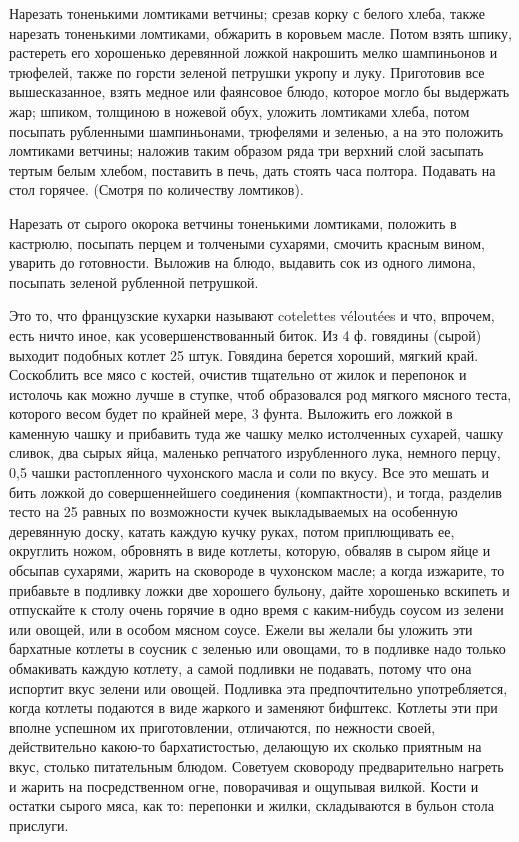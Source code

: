
Нарезать тоненькими ломтиками ветчины; срезав корку с белого хлеба, также нарезать тоненькими ломтиками, обжарить в коровьем масле. Потом взять шпику, растереть его хорошенько деревянной ложкой накрошить мелко шампиньонов и трюфелей, также по горсти зеленой петрушки укропу и луку. Приготовив все вышесказанное, взять медное или фаянсовое блюдо, которое могло бы выдержать жар; шпиком, толщиною в ножевой обух, уложить ломтиками хлеба, потом посыпать рубленными шампиньонами, трюфелями и зеленью, а на это положить ломтиками ветчины; наложив таким образом ряда три верхний слой засыпать тертым белым хлебом, поставить в печь, дать стоять часа полтора. Подавать на стол горячее. (Смотря по количеству ломтиков). 


Нарезать от сырого окорока ветчины тоненькими ломтиками, положить в кастрюлю, посыпать перцем и толчеными сухарями, смочить красным вином, уварить до готовности. Выложив на блюдо, выдавить сок из одного лимона, посыпать зеленой рубленной петрушкой.


Это то, что французские кухарки называют cotelettes véloutées и что, впрочем, есть ничто иное, как усовершенствованный биток. Из 4 ф. говядины (сырой) выходит подобных котлет 25 штук. Говядина берется хороший, мягкий край. Соскоблить все мясо с костей, очистив тщательно от жилок и перепонок и истолочь как можно лучше в ступке, чтоб образовался род мягкого мясного теста, которого весом будет по крайней мере, 3 фунта. Выложить его ложкой в каменную чашку и прибавить туда же чашку мелко истолченных сухарей, чашку сливок, два сырых яйца, маленько репчатого изрубленного лука, немного перцу, 0,5 чашки растопленного чухонского масла и соли по вкусу. Все это мешать и бить ложкой до совершеннейшего соединения (компактности), и тогда, разделив тесто на 25 равных по возможности кучек выкладываемых на особенную деревянную доску, катать каждую кучку руках, потом приплющивать ее, округлить ножом, обровнять в виде котлеты, которую, обваляв в сыром яйце и обсыпав сухарями, жарить на сковороде в чухонском масле; а когда изжарите, то прибавьте в подливку ложки две хорошего бульону, дайте хорошенько вскипеть и отпускайте к столу очень горячие в одно время с каким-нибудь соусом из зелени или овощей, или в особом мясном соусе. Ежели вы желали бы уложить эти бархатные котлеты в соусник с зеленью или овощами, то в подливке надо только обмакивать каждую котлету, а самой подливки не подавать, потому что она испортит вкус зелени или овощей. Подливка эта предпочтительно употребляется, когда котлеты подаются в виде жаркого и заменяют бифштекс. Котлеты эти при вполне успешном их приготовлении, отличаются, по нежности своей, действительно какою-то бархатистостью, делающую их сколько приятным на вкус, столько питательным блюдом. Советуем сковороду предварительно нагреть и жарить на посредственном огне, поворачивая и ощупывая вилкой. Кости и остатки сырого мяса, как то: перепонки и жилки, складываются в бульон стола прислуги. 


